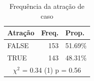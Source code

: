 
\begin{table}[!htb]

\caption{\label{tab:atração}Frequência da atração de caso}
\centering
\begin{tabular}[t]{lrl}
\toprule
Atração & Freq. & Prop.\\
\midrule
FALSE & 153 & 51.69\%\\
TRUE & 143 & 48.31\%\\
\midrule
\multicolumn{3}{c}{$\chi^2$ = 0.34 (1) p = 0.56}\\
\bottomrule
\end{tabular}
\end{table}

